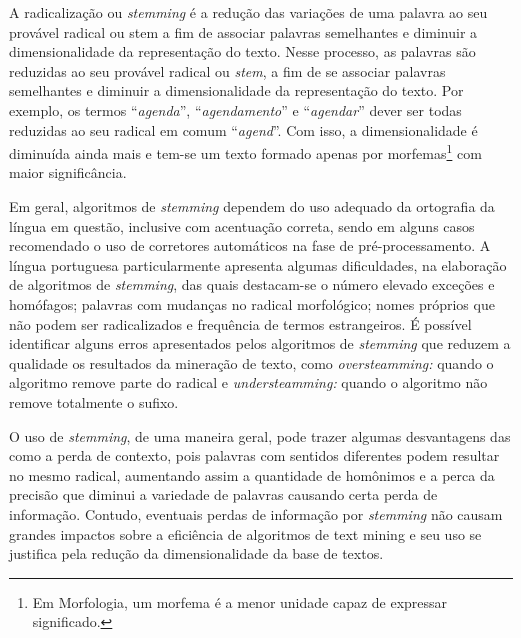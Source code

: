 A radicalização ou \textit{stemming} é a redução das variações de uma palavra ao seu provável radical ou stem a fim de associar palavras semelhantes e diminuir a dimensionalidade da representação do texto.
Nesse processo, as palavras são reduzidas ao seu provável radical ou \textit{stem}, a fim de se associar palavras semelhantes e diminuir a dimensionalidade da representação do texto. Por exemplo, os termos ``\textit{agenda}'', ``\textit{agendamento}'' e ``\textit{agendar}'' dever ser todas reduzidas ao seu radical em comum ``\textit{agend}''. Com isso, a dimensionalidade é diminuída ainda mais e tem-se um texto formado apenas por morfemas\footnote{Em Morfologia, um morfema é a menor unidade capaz de expressar significado.} com maior significância.  
% 
%

Em geral, algoritmos de \textit{stemming} dependem do uso adequado da ortografia da língua em questão, inclusive com acentuação correta, sendo em alguns casos recomendado o uso de corretores automáticos na fase de pré-processamento. A língua portuguesa particularmente apresenta algumas dificuldades, na elaboração de algoritmos de \textit{stemming}, das quais destacam-se o número elevado exceções e homófagos; palavras com mudanças no radical morfológico; nomes próprios que não podem ser radicalizados e frequência de termos estrangeiros.  É possível identificar alguns erros apresentados pelos algoritmos de \textit{stemming} que reduzem a qualidade os resultados da mineração de texto, como \textit{oversteamming:} quando o algoritmo remove parte do radical e \textit{understeamming:} quando o algoritmo não remove totalmente o sufixo.

O uso de \textit{stemming}, de uma maneira geral, pode trazer algumas desvantagens das como a perda de contexto, pois palavras com sentidos diferentes podem resultar no mesmo radical, aumentando assim a quantidade de homônimos e a perca da precisão que diminui a variedade de palavras causando certa perda de informação. Contudo, eventuais perdas de informação por \textit{stemming} não causam grandes impactos sobre a eficiência de algoritmos de text mining e seu uso se justifica pela redução da dimensionalidade da base de textos.



